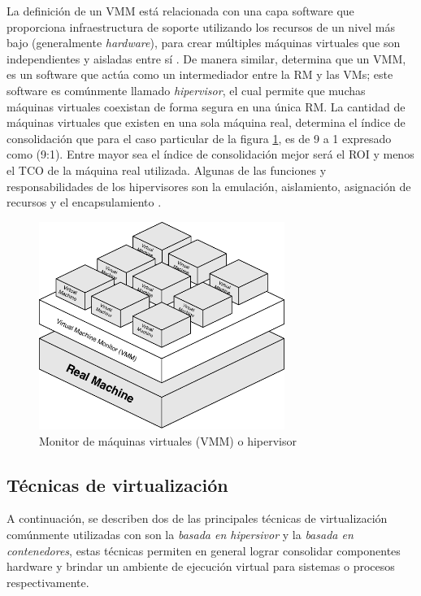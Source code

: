 La definición de un VMM está relacionada con una capa software que proporciona  infraestructura de soporte utilizando los recursos de un nivel más bajo (generalmente \textit{hardware}), para crear múltiples máquinas virtuales que son independientes y aisladas entre sí \parencite{Chiueh2005, Cafaro2011}. De manera similar, \textcite{Stallings2015}  determina  que un VMM, es un software que actúa como un intermediador entre la RM y las VMs; este software es comúnmente llamado \textit{hipervisor}, el cual permite que muchas máquinas virtuales coexistan de forma segura en una única RM. La cantidad de máquinas virtuales que existen en una sola máquina real, determina el índice de consolidación que para el caso particular de la figura \ref{fig:VMM}, es de 9 a 1 expresado como (9:1). Entre mayor sea el índice de consolidación mejor será el ROI y menos el TCO de la máquina real utilizada. Algunas de las funciones y responsabilidades de los hipervisores son la emulación, aislamiento, asignación de recursos y el encapsulamiento \parencite{Hoopes2009}.

\begin{figure}[!hbtp]
	\centering
	\includegraphics[width=8cm]{Pictures/VMMGeneric.pdf}
	\vspace{-0.2cm}
	\caption{Monitor de máquinas virtuales (VMM) o hipervisor}
	\label{fig:VMM}
\end{figure}

\subsection{Técnicas de virtualización}

A continuación, se describen dos de las principales técnicas de virtualización comúnmente utilizadas con son la \textit{basada en hipersivor} y la \textit{basada en contenedores}, estas técnicas permiten en general lograr consolidar componentes hardware y brindar un ambiente de ejecución virtual para sistemas o procesos respectivamente.

